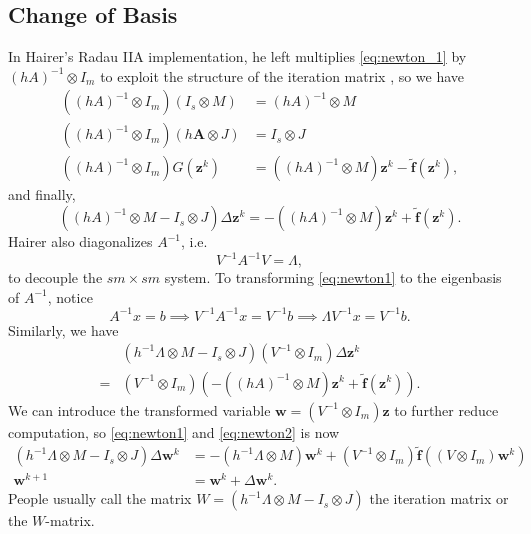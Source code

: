 \documentclass[a4paper,9pt]{article}
\theoremstyle{definition}
\theoremstyle{remark}
\begin{document}
\subsection{Change of Basis}
In Hairer's Radau IIA implementation, he left
multiplies \cref{eq:newton_1} by $(hA)^{-1} \otimes I_m$ to exploit the
structure of the iteration matrix \cite{hairer1999stiff}, so we have
\begin{align}
  ((hA)^{-1} \otimes I_m)(I_s \otimes M) &= (hA)^{-1} \otimes M \\
  ((hA)^{-1} \otimes I_m)(h\bm{A}\otimes J) &= I_s\otimes J \\
  ((hA)^{-1} \otimes I_m)G(\bm{z}^k) &= ((hA)^{-1} \otimes M) \bm{z}^k -
  \tilde{\bm{f}}(\bm{z}^k),
\end{align}
and finally,
\begin{equation} \label{eq:newton1}
  ((hA)^{-1} \otimes M - I_s\otimes J) \Delta \bm{z}^k = -((hA)^{-1} \otimes M)
  \bm{z}^k + \tilde{\bm{f}}(\bm{z}^k).
\end{equation}
Hairer also diagonalizes $A^{-1}$, i.e.
\begin{equation}
  V^{-1}A^{-1}V = \Lambda,
\end{equation}
to decouple the $sm \times sm$ system. To transforming \cref{eq:newton1} to
the eigenbasis of $A^{-1}$, notice
\begin{equation}
  A^{-1}x = b \implies V^{-1}A^{-1}x = V^{-1}b \implies \Lambda V^{-1}x =
  V^{-1}b.
\end{equation}
Similarly, we have
\begin{align}
  &(h^{-1} \Lambda \otimes M - I_s\otimes J) (V^{-1}\otimes I_m)\Delta\bm{z}^k\\
  =& (V^{-1}\otimes I_m)(-((hA)^{-1} \otimes M)
  \bm{z}^k + \tilde{\bm{f}}(\bm{z}^k)).
\end{align}
We can introduce the transformed variable $\bm{w} = (V^{-1}\otimes I_m) \bm{z}$
to further reduce computation, so \cref{eq:newton1} and \cref{eq:newton2} is now
\begin{align} \label{eq:newton2}
  (h^{-1} \Lambda \otimes M - I_s\otimes J) \Delta\bm{w}^k
  &= -(h^{-1} \Lambda \otimes M) \bm{w}^k +
  (V^{-1}\otimes I_m)\tilde{\bm{f}}((V\otimes I_m)\bm{w}^k) \\
  \bm{w}^{k+1} &= \bm{w}^{k} + \Delta \bm{w}^k.
\end{align}
People usually call the matrix $W=(h^{-1} \Lambda \otimes M - I_s\otimes J)$ the
iteration matrix or the $W$-matrix.
\end{document}
